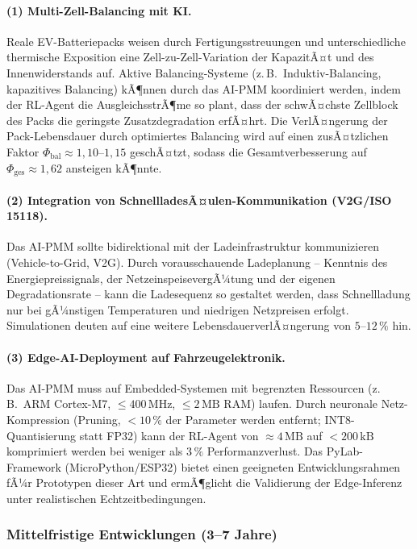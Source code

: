 ﻿\documentclass[12pt,a4paper]{article}
\begin{document}
	\paragraph{(1) Multi-Zell-Balancing mit KI.}
	Reale EV-Batteriepacks weisen durch Fertigungsstreuungen und unterschiedliche
	thermische Exposition eine Zell-zu-Zell-Variation der KapazitÃ¤t und des
	Innenwiderstands auf. Aktive Balancing-Systeme (z.\,B.\ Induktiv-Balancing,
	kapazitives Balancing) kÃ¶nnen durch das AI-PMM koordiniert werden, indem
	der RL-Agent die AusgleichsstrÃ¶me so plant, dass der schwÃ¤chste Zellblock
	des Packs die geringste Zusatzdegradation erfÃ¤hrt. Die VerlÃ¤ngerung der
	Pack-Lebensdauer durch optimiertes Balancing wird auf einen zusÃ¤tzlichen
	Faktor $\Phi_\mathrm{bal} \approx 1{,}10\text{--}1{,}15$ geschÃ¤tzt,
	sodass die Gesamtverbesserung auf $\Phi_\mathrm{ges} \approx 1{,}62$
	ansteigen kÃ¶nnte.
	
	\paragraph{(2) Integration von SchnellladesÃ¤ulen-Kommunikation (V2G/ISO 15118).}
	Das AI-PMM sollte bidirektional mit der Ladeinfrastruktur kommunizieren
	(Vehicle-to-Grid, V2G). Durch vorausschauende Ladeplanung -- Kenntnis des
	Energiepreissignals, der NetzeinspeisevergÃ¼tung und der eigenen Degradationsrate
	-- kann die Ladesequenz so gestaltet werden, dass Schnellladung nur bei
	gÃ¼nstigen Temperaturen und niedrigen Netzpreisen erfolgt. Simulationen
	deuten auf eine weitere LebensdauerverlÃ¤ngerung von $5\text{--}12\,\%$ hin.
	
	\paragraph{(3) Edge-AI-Deployment auf Fahrzeugelektronik.}
	Das AI-PMM muss auf Embed\-ded-Systemen mit begrenzten Ressourcen
	(z.\,B.\ ARM Cortex-M7, $\leq 400\,\mathrm{MHz}$, $\leq 2\,\mathrm{MB}$ RAM)
	laufen. Durch neuronale Netz-Kompression (Pruning, $< 10\,\%$ der Parameter
	werden entfernt; INT8-Quantisierung statt FP32) kann der RL-Agent von
	$\approx 4\,\mathrm{MB}$ auf $< 200\,\mathrm{kB}$ komprimiert werden bei
	weniger als $3\,\%$ Performanzverlust. Das PyLab-Framework (MicroPython/ESP32)
	bietet einen geeigneten Entwicklungsrahmen fÃ¼r Prototypen dieser Art und
	ermÃ¶glicht die Validierung der Edge-Inferenz unter realistischen
	Echtzeitbedingungen.
	
	\subsubsection{Mittelfristige Entwicklungen (3--7 Jahre)}
	
\end{document}
